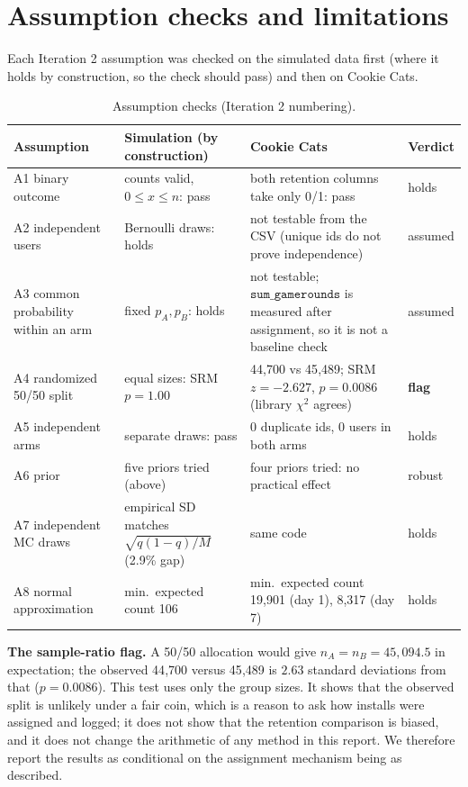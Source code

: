 \documentclass[11pt]{article}
\begin{document}
\section{Assumption checks and limitations}\label{sec:assumptions3}
Each Iteration 2 assumption was checked on the simulated data first (where it holds by construction, so the check should pass) and then on Cookie Cats.
\begin{table}[H]\centering\small
\caption{Assumption checks (Iteration 2 numbering).}
\begin{tabular}{p{3.2cm}p{3.9cm}p{3.9cm}p{3.6cm}}\toprule
Assumption & Simulation (by construction) & Cookie Cats & Verdict\\\midrule
A1 binary outcome & counts valid, $0\le x\le n$: pass & both retention columns take only 0/1: pass & holds\\
A2 independent users & Bernoulli draws: holds & not testable from the CSV (unique ids do not prove independence) & assumed\\
A3 common probability within an arm & fixed $p_A,p_B$: holds & not testable; $\texttt{sum\_gamerounds}$ is measured after assignment, so it is not a baseline check & assumed\\
A4 randomized 50/50 split & equal sizes: SRM $p=1.00$ & 44{,}700 vs 45{,}489; SRM $z=-2.627$, $p=0.0086$ (library $\chi^2$ agrees) & \textbf{flag}\\
A5 independent arms & separate draws: pass & 0 duplicate ids, 0 users in both arms & holds\\
A6 prior & five priors tried (above) & four priors tried: no practical effect & robust\\
A7 independent MC draws & empirical SD matches $\sqrt{q(1-q)/M}$ (2.9\% gap) & same code & holds\\
A8 normal approximation & min.\ expected count 106 & min.\ expected count 19{,}901 (day 1), 8{,}317 (day 7) & holds\\\bottomrule
\end{tabular}
\end{table}
\textbf{The sample-ratio flag.} A 50/50 allocation would give $n_A=n_B=45{,}094.5$ in expectation; the observed 44{,}700 versus 45{,}489 is $2.63$ standard deviations from that ($p=0.0086$). This test uses only the group sizes. It shows that the observed split is unlikely under a fair coin, which is a reason to ask how installs were assigned and logged; it does not show that the retention comparison is biased, and it does not change the arithmetic of any method in this report. We therefore report the results as conditional on the assignment mechanism being as described.
\end{document}
